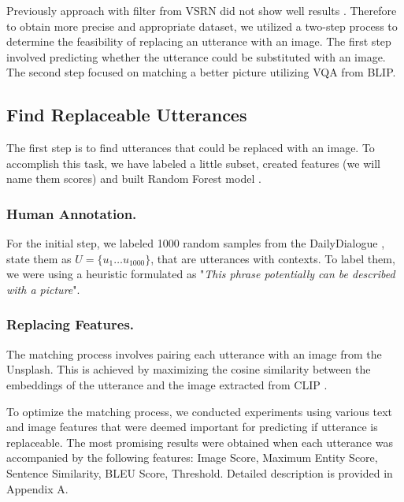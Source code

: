 
Previously approach with filter from VSRN did not show well results \cite{Lee-2021}. 
Therefore to obtain more precise and appropriate dataset, we utilized a two-step process to determine the feasibility of replacing an utterance with an image. The first step involved predicting whether the utterance could be substituted with an image. The second step focused on matching a better picture utilizing VQA from BLIP.







\subsection{Find Replaceable Utterances}

The first step is to find utterances that could be replaced with an image. To accomplish this task, we have labeled a little subset, created features (we will name them scores) and built Random Forest model \cite{scikit-learn}.

\subsubsection{Human Annotation.}

For the initial step, we labeled 1000 random samples from the DailyDialogue \cite{Li-Su-2017}, state them as $U = \{u_1 \dots u_{1000}\}$, that are utterances with contexts. To label them, we were using a heuristic formulated as "\textit{This phrase potentially can be described with a picture}".

\subsubsection{Replacing Features.}

The matching process involves pairing each utterance with an image from the Unsplash. This is achieved by maximizing the cosine similarity between the embeddings of the utterance and the image extracted from CLIP \cite{Radford-2021}. 

\smallskip

To optimize the matching process, we conducted experiments using various text and image features that were deemed important for predicting if utterance is replaceable. The most promising results were obtained when each utterance was accompanied by the following features: Image Score, Maximum Entity Score, Sentence Similarity, BLEU Score, Threshold. Detailed description is provided in Appendix A.


